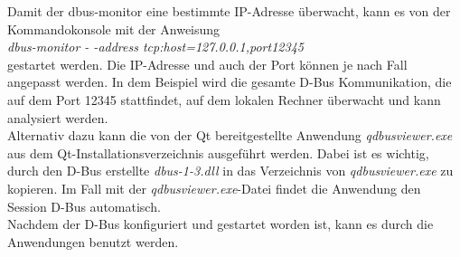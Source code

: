 Damit der dbus-monitor eine bestimmte IP-Adresse überwacht, kann es von der Kommandokonsole mit der Anweisung\\ \textit{dbus-monitor - -address tcp:host=127.0.0.1,port12345}\\ gestartet werden. Die IP-Adresse und auch der Port können je nach Fall angepasst werden. In dem Beispiel wird die gesamte D-Bus Kommunikation, die auf dem Port 12345 stattfindet, auf dem lokalen Rechner überwacht und kann analysiert werden. \\
Alternativ dazu kann die von der Qt bereitgestellte Anwendung \textit{qdbusviewer.exe} \label{qdbusviewer} aus dem Qt-Installationsverzeichnis ausgeführt werden. Dabei ist es wichtig, durch den D-Bus erstellte \textit{dbus-1-3.dll} in das Verzeichnis von  \textit{qdbusviewer.exe} zu kopieren. Im Fall mit der \textit{qdbusviewer.exe}-Datei findet die Anwendung den Session D-Bus automatisch.\\
Nachdem der D-Bus konfiguriert und gestartet worden ist, kann es durch die Anwendungen benutzt werden.

